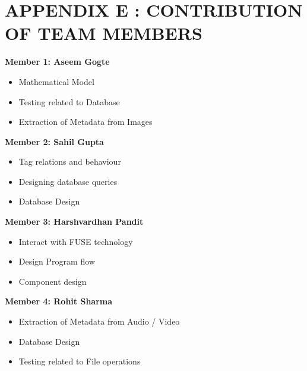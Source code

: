 \chapter*{APPENDIX E : CONTRIBUTION OF TEAM MEMBERS} 
\noindent \textbf{Member 1: Aseem Gogte} 
\begin{itemize}
\item Mathematical Model
\item Testing related to Database 
\item Extraction of Metadata from Images \\
\end{itemize}

\noindent \textbf{Member 2: Sahil Gupta}
\begin{itemize}
\item Tag relations and behaviour
\item Designing database queries
\item Database Design \\
\end{itemize}

\noindent \textbf {Member 3: Harshvardhan Pandit} 
\begin{itemize}
\item Interact with FUSE technology
\item Design Program flow
\item Component design \\
\end{itemize}

\noindent \textbf {Member 4: Rohit Sharma} 
\begin{itemize}
\item Extraction of Metadata from Audio / Video 
\item Database Design
\item Testing related to File operations
\end{itemize}

